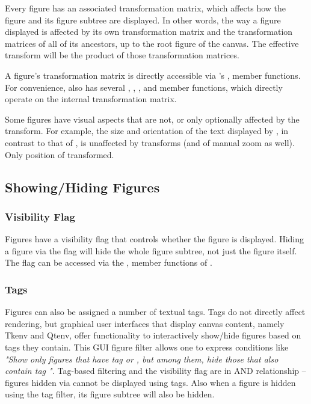 Every figure has an associated transformation matrix, which
affects how the figure and its figure subtree are displayed.
In other words, the way a figure displayed is affected by its own
transformation matrix and the transformation matrices of all of its
ancestors, up to the root figure of the canvas. The effective transform
will be the product of those transformation matrices.

A figure's transformation matrix is directly accessible via 's
,  member functions.
For convenience,  also has several , ,
,  and  member functions,
which directly operate on the internal transformation matrix.

Some figures have visual aspects that are not, or only optionally affected
by the transform. For example, the size and orientation of the text
displayed by , in contrast to that of
, is unaffected by transforms (and of manual zoom as
well). Only position of transformed.


\subsection{Showing/Hiding Figures}

\subsubsection{Visibility Flag}

Figures have a visibility flag that controls whether the figure is
displayed. Hiding a figure via the flag will hide the whole figure subtree,
not just the figure itself. The flag can be accessed via the
,  member functions of
.


\subsubsection{Tags}

Figures can also be assigned a number of textual tags. Tags do not directly
affect rendering, but graphical user interfaces that display canvas
content, namely Tkenv and Qtenv, offer functionality to interactively
show/hide figures based on tags they contain. This GUI figure filter allows
one to express conditions like \textit{"Show only figures that have tag
 or , but among them, hide those that also contain
tag ".} Tag-based filtering and the visibility flag are in AND
relationship -- figures hidden via  cannot be
displayed using tags. Also when a figure is hidden using the tag filter,
its figure subtree will also be hidden.

